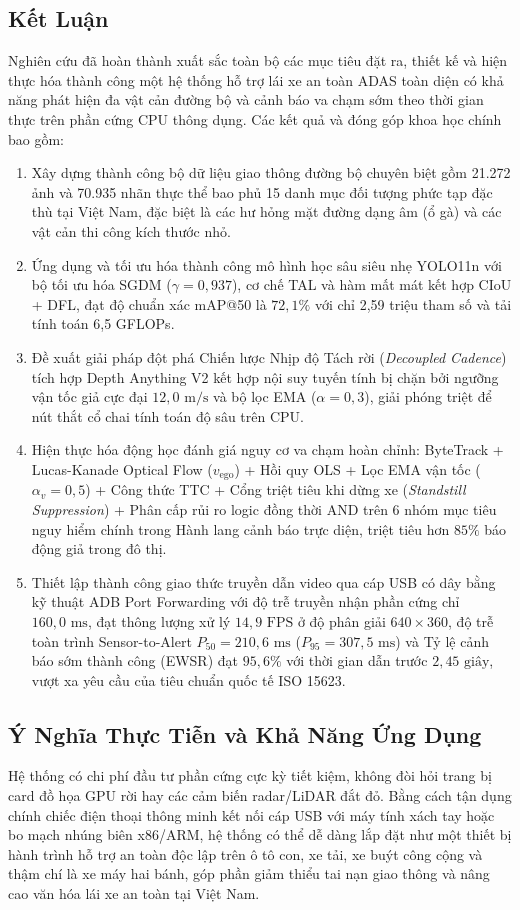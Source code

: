 \documentclass[12pt,a4paper]{article}
\begin{document}
\subsection{Kết Luận}
Nghiên cứu đã hoàn thành xuất sắc toàn bộ các mục tiêu đặt ra, thiết kế và hiện thực hóa thành công một hệ thống hỗ trợ lái xe an toàn ADAS toàn diện có khả năng phát hiện đa vật cản đường bộ và cảnh báo va chạm sớm theo thời gian thực trên phần cứng CPU thông dụng. Các kết quả và đóng góp khoa học chính bao gồm:
\begin{enumerate}
    \item Xây dựng thành công bộ dữ liệu giao thông đường bộ chuyên biệt gồm 21.272 ảnh và 70.935 nhãn thực thể bao phủ 15 danh mục đối tượng phức tạp đặc thù tại Việt Nam, đặc biệt là các hư hỏng mặt đường dạng âm (ổ gà) và các vật cản thi công kích thước nhỏ.
    \item Ứng dụng và tối ưu hóa thành công mô hình học sâu siêu nhẹ YOLO11n với bộ tối ưu hóa SGDM ($\gamma = 0,937$), cơ chế TAL và hàm mất mát kết hợp CIoU + DFL, đạt độ chuẩn xác mAP@50 là $72,1\%$ với chỉ 2,59 triệu tham số và tải tính toán 6,5 GFLOPs.
    \item Đề xuất giải pháp đột phá Chiến lược Nhịp độ Tách rời (\textit{Decoupled Cadence}) tích hợp Depth Anything V2 kết hợp nội suy tuyến tính bị chặn bởi ngưỡng vận tốc giả cực đại $12,0\text{ m/s}$ và bộ lọc EMA ($\alpha = 0,3$), giải phóng triệt để nút thắt cổ chai tính toán độ sâu trên CPU.
    \item Hiện thực hóa động học đánh giá nguy cơ va chạm hoàn chỉnh: ByteTrack + Lucas-Kanade Optical Flow ($v_{\text{ego}}$) + Hồi quy OLS + Lọc EMA vận tốc ($\alpha_v = 0,5$) + Công thức TTC + Cổng triệt tiêu khi dừng xe (\textit{Standstill Suppression}) + Phân cấp rủi ro logic đồng thời AND trên 6 nhóm mục tiêu nguy hiểm chính trong Hành lang cảnh báo trực diện, triệt tiêu hơn $85\%$ báo động giả trong đô thị.
    \item Thiết lập thành công giao thức truyền dẫn video qua cáp USB có dây bằng kỹ thuật ADB Port Forwarding với độ trễ truyền nhận phần cứng chỉ $160,0\text{ ms}$, đạt thông lượng xử lý $14,9\text{ FPS}$ ở độ phân giải $640 \times 360$, độ trễ toàn trình Sensor-to-Alert $P_{50} = 210,6\text{ ms}$ ($P_{95} = 307,5\text{ ms}$) và Tỷ lệ cảnh báo sớm thành công (EWSR) đạt $95,6\%$ với thời gian dẫn trước $2,45\text{ giây}$, vượt xa yêu cầu của tiêu chuẩn quốc tế ISO 15623.
\end{enumerate}

\subsection{Ý Nghĩa Thực Tiễn và Khả Năng Ứng Dụng}
Hệ thống có chi phí đầu tư phần cứng cực kỳ tiết kiệm, không đòi hỏi trang bị card đồ họa GPU rời hay các cảm biến radar/LiDAR đắt đỏ. Bằng cách tận dụng chính chiếc điện thoại thông minh kết nối cáp USB với máy tính xách tay hoặc bo mạch nhúng biên x86/ARM, hệ thống có thể dễ dàng lắp đặt như một thiết bị hành trình hỗ trợ an toàn độc lập trên ô tô con, xe tải, xe buýt công cộng và thậm chí là xe máy hai bánh, góp phần giảm thiểu tai nạn giao thông và nâng cao văn hóa lái xe an toàn tại Việt Nam.
\end{document}

